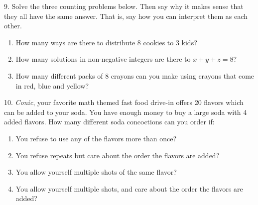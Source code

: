 \documentclass[10pt,]{book}
\theoremstyle{plain}
\theoremstyle{definition}
\theoremstyle{definition}
\theoremstyle{definition}
\numberwithin{equation}{section}
\begin{document}
\begin{exerciselist}
%
\par\smallskip
\item[9.]\hypertarget{exercise-90}{}
Solve the three counting problems below. Then say why it makes sense that they all have the same answer. That is, say how you can interpret them as each other.
%
\leavevmode%
\begin{enumerate}[label=(\alph*)]
\item\hypertarget{li-598}{}
How many ways are there to distribute 8 cookies to 3 kids?
%
\item\hypertarget{li-599}{}
How many solutions in non-negative integers are there to \(x+y+z = 8\)?
%
\item\hypertarget{li-600}{}
How many different packs of 8 crayons can you make using crayons that come in red, blue and yellow?
%
\end{enumerate}
\par\smallskip
\item[10.]\hypertarget{exercise-91}{}
\emph{Conic}, your favorite math themed fast food drive-in offers 20 flavors which can be added to your soda. You have enough money to buy a large soda with 4 added flavors. How many different soda concoctions can you order if:
%
\leavevmode%
\begin{enumerate}[label=(\alph*)]
\item\hypertarget{li-601}{}
You refuse to use any of the flavors more than once?
%
\item\hypertarget{li-602}{}
You refuse repeats but care about the order the flavors are added?
%
\item\hypertarget{li-603}{}
You allow yourself multiple shots of the same flavor?
%
\item\hypertarget{li-604}{}
You allow yourself multiple shots, and care about the order the flavors are added?
%
\end{enumerate}
\par\smallskip
\end{exerciselist}
\typeout{************************************************}
\typeout{************************************************}
\end{document}
